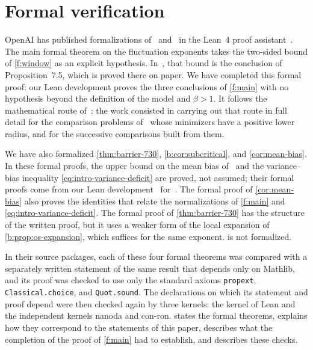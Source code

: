 \section{Formal verification}\label{sec:intro-formal}

OpenAI has published formalizations of~\cite{oai-barriers}
and~\cite{oai-fluctuations} in the Lean~4 proof
assistant~\cite{lean4,mathlib,oai-math-lean}. The main formal theorem on the
fluctuation exponents takes the two-sided bound of \cref{f:window} as an
explicit hypothesis. In~\cite{oai-fluctuations}, that bound is the
conclusion of Proposition~7.5, which is proved there on paper. We have
completed this formal proof: our Lean development proves the three
conclusions of \cref{f:main} with no hypothesis beyond the definition of the
model and $\beta>1$. It follows the mathematical route
of~\cite{oai-fluctuations}; the work consisted in carrying out that route in
full detail for the comparison problems of~\cite[Section~3]{oai-fluctuations}
whose minimizers have a positive lower radius, and for the successive
comparisons built from them.

We have also formalized \cref{thm:barrier-730}, \cref{b:cor:subcritical},
and \cref{cor:mean-bias}. In these formal proofs, the upper bound on the
mean bias of~\cite[Theorem~1.1]{hexagon-bias} and the variance--bias
inequality \eqref{eq:intro-variance-deficit} are proved, not assumed;
their formal proofs come from our Lean development~\cite{hexagon-bias-lean}
for~\cite{hexagon-bias}. The formal proof of \cref{cor:mean-bias} also
proves the identities that relate the normalizations of \cref{f:main} and
\eqref{eq:intro-variance-deficit}. The formal proof of
\cref{thm:barrier-730} has the structure of the written proof, but it uses
a weaker form of the local expansion of \cref{b:prop:os-expansion}, which
suffices for the same exponent.  is not
formalized.

In their source packages, each of these four formal theorems was compared with a separately written
statement of the same result that depends only on Mathlib, and its proof was
checked to use only the standard axioms \texttt{propext},
\texttt{Classical.choice}, and \texttt{Quot.sound}. The declarations on
which its statement and proof depend were then checked again by three
kernels: the kernel of Lean and the independent kernels nanoda and con-ron.
 states the formal theorems, explains how they correspond
to the statements of this paper, describes what the completion of the proof
of \cref{f:main} had to establish, and describes these checks.

